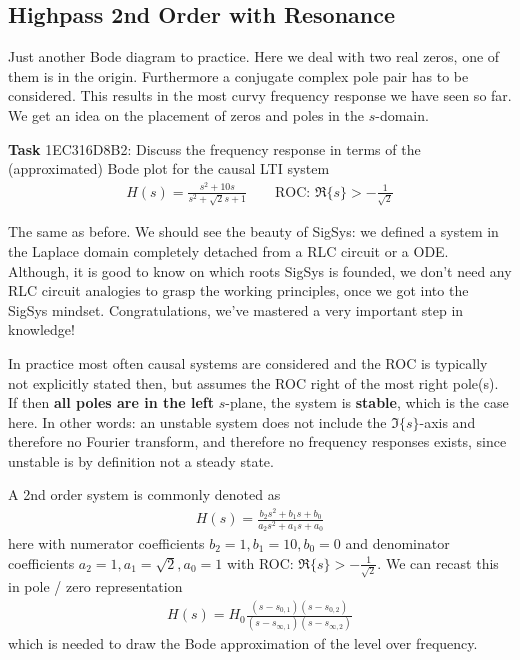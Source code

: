 \documentclass[11pt,a4paper,DIV=12]{scrartcl}
\numberwithin{equation}{section}
\numberwithin{figure}{section}
\begin{document}
\subsection{Highpass 2nd Order with Resonance}
\label{sec:1EC316D8B2}
\begin{Ziel}
Just another Bode diagram to practice. Here we deal with two real zeros,
one of them is in the origin. Furthermore a conjugate complex pole pair has to be
considered. This results in the most curvy frequency response we have seen so far.
We get an idea on the placement of zeros and poles in the $s$-domain.
\end{Ziel}
\textbf{Task} {\tiny 1EC316D8B2}:  Discuss the frequency response in terms
of the (approximated) Bode plot for the causal LTI system
\begin{align}
H(s) = \frac{s^2+10 s}{s^2+\sqrt{2} s +1}\qquad\text{ROC: }
\Re\{s\}>-\frac{1}{\sqrt{2}}
\end{align}
\begin{Werkzeug}
The same as before. We should see the beauty of SigSys: we defined a system
in the Laplace domain completely detached from a RLC circuit or a ODE.
Although, it is good to know on which roots SigSys is founded, we don't need
any RLC circuit analogies to grasp the working principles, once we got into the
SigSys mindset. Congratulations, we've mastered a very important step in knowledge!
\end{Werkzeug}
\begin{Ansatz}
In practice most often causal systems are considered and the ROC is typically
not explicitly stated then, but assumes the ROC right of the most right pole(s).
If then \textbf{all poles are in the left} $s$-plane, the system is \textbf{stable},
which is the case here.
In other words: an unstable system does not include the $\Im\{s\}$-axis and therefore
no Fourier transform, and therefore no frequency responses exists, since unstable
is by definition not a steady state. 

A 2nd order system is commonly denoted as
\begin{align}
H(s) = \frac{b_2 s^2+b_1 s + b_0}{a_2 s^2+a_1 s +a_0}
\end{align}
here with numerator coefficients $b_2 = 1, b_1 = 10, b_0=0$ and denominator
coefficients
$a_2 = 1, a_1 = \sqrt{2}, a_0=1$ with ROC: $\Re\{s\}>-\frac{1}{\sqrt{2}}$.
We can recast this in pole / zero representation
\begin{align}
H(s) = H_0\frac{(s-s_{0,1}) (s-s_{0,2})}{(s-s_{\infty,1})(s-s_{\infty,2})}
\end{align}
which is needed to draw the Bode approximation of the level over frequency.
\end{Ansatz}
\end{document}
